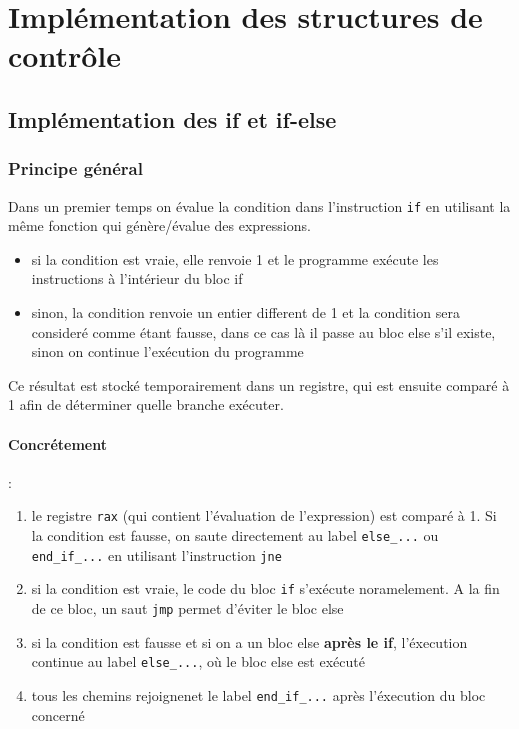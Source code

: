 \documentclass[a4paper, 12pt]{report}
\begin{document}
\section{Implémentation des structures de contrôle}
\subsection{Implémentation des if et if-else}
\subsubsection{Principe général}
Dans un premier temps on évalue la condition dans l'instruction \texttt{if} en utilisant la même fonction qui génère/évalue des expressions. 

\renewcommand{\labelitemi}{\textbullet}
\begin{itemize}
	\item si la condition est vraie, elle renvoie 1 et le programme exécute les instructions à l'intérieur du bloc if 
	\item sinon, la condition renvoie un entier different de 1 et la condition sera consideré comme étant fausse, dans ce cas là il passe au bloc else s'il existe, sinon on continue l'exécution du programme

\end{itemize}
Ce résultat est stocké temporairement dans un registre, qui est ensuite comparé à 1 afin de déterminer quelle branche exécuter. 

\paragraph*{Concrétement} :

\begin{enumerate}
	\item le registre \texttt{rax} (qui contient l'évaluation de l'expression) est comparé à 1. Si la condition est fausse, on saute directement au label \texttt{else\_...} ou \texttt{end\_if\_...} en utilisant l'instruction \texttt{jne}
	\item si la condition est vraie, le code du bloc \texttt{if} s'exécute noramelement. A la fin de ce bloc, un saut \texttt{jmp} permet d'éviter le bloc else
	\item si la condition est fausse et si on a un bloc else \textbf{après le if}, l'éxecution continue au label \texttt{else\_...}, où le bloc else est exécuté
	\item tous les chemins rejoignenet le label \texttt{end\_if\_...} après l'éxecution du bloc concerné
	
\end{enumerate}
\end{document}
